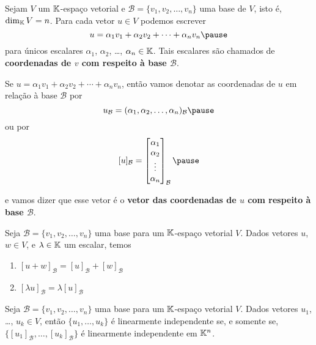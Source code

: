 \documentclass{beamer}
\begin{document}
\begin{frame}
  \begin{definicao}
    Sejam $V$ um $\mathbb{K}$-espaço vetorial \pause e $\mathcal{B} = \{v_1, v_2, \dots, v_n\}$ uma base de $V$, \pause isto é, $\dim_{\mathbb{K}}V = n$. \pause Para cada vetor $u \in V$ \pause podemos escrever
    \[
      u = \alpha_1v_1 + \alpha_2v_2 + \cdots + \alpha_nv_n\pause
    \]
    para únicos escalares \pause $\alpha_1$, $\alpha_2$, \dots, $\alpha_n \in \mathbb{K}$. \pause Tais escalares são chamados de \textbf{coordenadas de $v$ com respeito à base $\mathcal{B}$}.\pause
  \end{definicao}
\end{frame}

\begin{frame}
  \begin{notacao}
    Se $u = \alpha_1v_1 + \alpha_2v_2 + \cdots + \alpha_nv_n$, \pause então vamos denotar as coordenadas de $u$ \pause em relação à base $\mathcal{B}$ por\pause
    \[
      u_\mathcal{B} = (\alpha_1, \alpha_2, \dots, \alpha_n)_\mathcal{B}\pause
    \]
    ou por
    \[
      [u]_\mathcal{B} = \begin{bmatrix}\alpha_1\\\alpha_2\\ \vdots\\ \alpha_n\end{bmatrix}_\mathcal{B}\pause
    \]

    e vamos dizer que esse vetor \pause é o \textbf{vetor das coordenadas de $u$ com respeito à base $\mathcal{B}$}.
  \end{notacao}
\end{frame}

\begin{frame}
  \begin{teorema}
    Seja $\mathcal{B} = \{v_1, v_2, \dots, v_n\}$ uma base para um $\mathbb{K}$-espaço vetorial $V$. Dados vetores $u$, $w \in V$, e $\lambda \in \mathbb{K}$ um escalar, temos
    \begin{enumerate}[label={\roman*})]
      \item $[u + w]_\mathcal{B} = [u]_\mathcal{B} + [w]_\mathcal{B}$

      \item $[\lambda u]_\mathcal{B} = \lambda[u]_\mathcal{B}$
    \end{enumerate}
  \end{teorema}
\end{frame}

\begin{frame}
  \begin{teorema}
    Seja $\mathcal{B} = \{v_1, v_2, \dots, v_n\}$ uma base para um $\mathbb{K}$-espaço vetorial $V$. Dados vetores $u_1$, \dots, $u_k \in V$, então $\{u_1, \dots, u_k\}$ é linearmente independente se, e somente se, $\{[u_1]_\mathcal{B}, \dots, [u_k]_\mathcal{B}\}$ é linearmente independente em $\mathbb{K}^n$.
  \end{teorema}
\end{frame}
\end{document}
